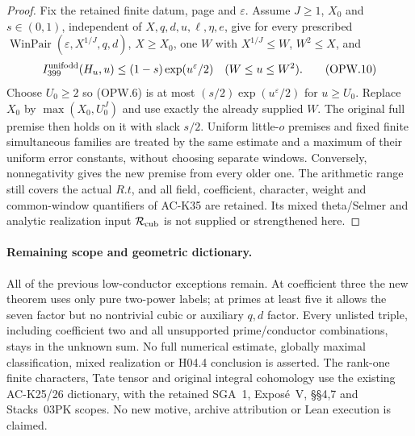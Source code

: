 \begin{proof}
Fix the retained finite datum, page and $\varepsilon$.
Assume $J\geq1$, $X_0$ and $s\in(0,1)$, independent of
$X,q,d,u,\ell,\eta,e$, give for every prescribed
$\operatorname{WinPair}(\varepsilon,X^{1/J},q,d)$, $X\geq X_0$,
one $W$ with $X^{1/J}\leq W$, $W^2\leq X$, and
\[
 I_{399}^{\rm unifodd}(H_u,u)\leq(1-s)\exp(u^\varepsilon/2)
                             \quad(W\leq u\leq W^2).
 \tag{OPW.10}
\]
Choose $U_0\geq2$ so (OPW.6) is at most
$(s/2)\exp(u^\varepsilon/2)$ for $u\geq U_0$.
Replace $X_0$ by $\max(X_0,U_0^J)$ and use exactly the already
supplied $W$.  The original full premise then holds on it with
slack $s/2$.
Uniform little-$o$ premises and fixed finite simultaneous families
are treated by the same estimate and a maximum of their uniform
error constants, without choosing separate windows.
Conversely, nonnegativity gives the new premise from every older one.
The arithmetic range still covers the actual $R.t$, and all field,
coefficient, character, weight and common-window quantifiers of
AC-K35 are retained.  Its mixed theta/Selmer and analytic realization
input $\mathcal R_{\rm cub}$ is not supplied or strengthened here.
\end{proof}

\paragraph{Remaining scope and geometric dictionary.}
All of the previous low-conductor exceptions remain.
At coefficient three the new theorem uses only pure two-power labels;
at primes at least five it allows the seven factor but no nontrivial
cubic or auxiliary $q,d$ factor.  Every unlisted triple, including
coefficient two and all unsupported prime/conductor combinations,
stays in the unknown sum.
No full numerical estimate, globally maximal classification,
mixed realization or H04.4 conclusion is asserted.
The rank-one finite characters, Tate tensor and original integral
cohomology use the existing AC-K25/26 dictionary, with the retained
SGA~1, Expos\'e~V, \S\S4,7 and Stacks~03PK scopes.
No new motive, archive attribution or Lean execution is claimed.
